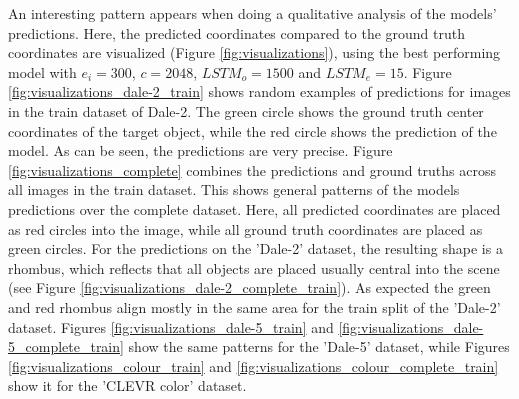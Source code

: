 An interesting pattern appears when doing a qualitative analysis of the models' predictions.
Here, the predicted coordinates compared to the ground truth coordinates are visualized (Figure \ref{fig:visualizations}), using the best performing model with $e_i=300$, $c=2048$, $LSTM_o=1500$ and $LSTM_e=15$.
Figure \ref{fig:visualizations_dale-2_train} shows random examples of predictions for images in the train dataset of Dale-2.
The green circle shows the ground truth center coordinates of the target object, while the red circle shows the prediction of the model.
As can be seen, the predictions are very precise.
Figure \ref{fig:visualizations_complete} combines the predictions and ground truths across all images in the train dataset.
This shows general patterns of the models predictions over the complete dataset.
Here, all predicted coordinates are placed as red circles into the image, while all ground truth coordinates are placed as green circles.
For the predictions on the 'Dale-2' dataset, the resulting shape is a rhombus, which reflects that all objects are placed usually central into the scene (see Figure \ref{fig:visualizations_dale-2_complete_train}).
As expected the green and red rhombus align mostly in the same area for the train split of the 'Dale-2' dataset.
Figures \ref{fig:visualizations_dale-5_train} and \ref{fig:visualizations_dale-5_complete_train} show the same patterns for the 'Dale-5' dataset, while Figures \ref{fig:visualizations_colour_train} and \ref{fig:visualizations_colour_complete_train} show it for the 'CLEVR color' dataset.

